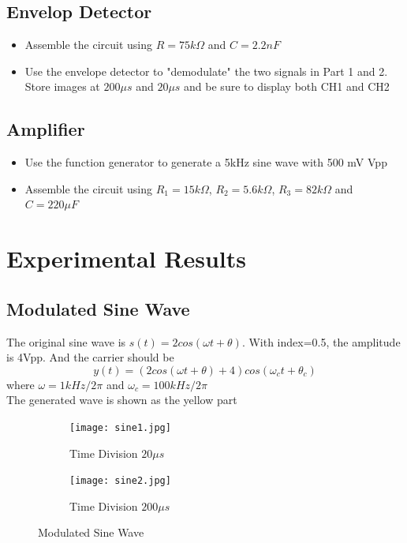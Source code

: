 \documentclass[a4paper]{article}
\begin{document}
    \subsection{Envelop Detector}
    \begin{itemize}
        \item Assemble the circuit using $R=75k\Omega$ and $C=2.2nF$
        \item Use the envelope detector to "demodulate" the two signals in Part 1 and 2. Store images at $200\mu s$ and $20\mu s$ and be sure to display both CH1 and CH2
    \end{itemize}
    \subsection{Amplifier}
    \begin{itemize}
        \item Use the function generator to generate a 5kHz sine wave with 500 mV Vpp
        \item Assemble the circuit using $R_1 = 15k\Omega$, $R_2 = 5.6k\Omega$, $R_3 = 82k\Omega$ and $C = 220\mu F$
    \end{itemize}

    \section{Experimental Results}
    \subsection{Modulated Sine Wave}
    The original sine wave is $s(t)=2cos(\omega t+\theta)$. With index=0.5, the amplitude is 4Vpp. And the carrier should be 
    $$y(t)=(2cos(\omega t+\theta)+4)cos(\omega_ct+\theta_c)$$
    where $\omega=1kHz/2\pi$ and $\omega_c=100kHz/2\pi$\\

    The generated wave is shown as the yellow part
    \begin{figure}[H]
        \centering
        \begin{subfigure}{0.4\textwidth}
            \texttt{[image: sine1.jpg]}
            \caption{Time Division $20\mu s$}
        \end{subfigure}
        \begin{subfigure}{0.4\textwidth}
            \texttt{[image: sine2.jpg]}
            \caption{Time Division $200\mu s$}
        \end{subfigure}
        \caption{Modulated Sine Wave}
    \end{figure} 
\end{document}
